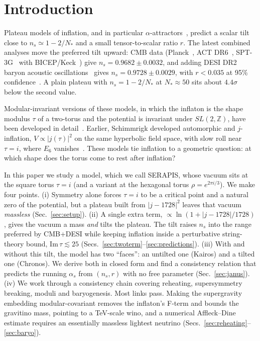 \documentclass[aps,prd,twocolumn,superscriptaddress,nofootinbib,floatfix]{revtex4-2}
\begin{document}
\section{Introduction}
Plateau models of inflation, and in particular $\alpha$-attractors~\cite{arXiv_1306_5220}, predict a scalar tilt close to $n_s \simeq 1-2/N_*$ and a small tensor-to-scalar ratio $r$. The latest combined analyses move the preferred tilt upward: CMB data (Planck~\cite{Planck2018X}, ACT DR6~\cite{arXiv_2503_14452}, SPT-3G~\cite{arXiv_2506_20707} with BICEP/Keck~\cite{arXiv_2110_00483}) give $n_s = 0.9682 \pm 0.0032$, and adding DESI DR2 baryon acoustic oscillations~\cite{arXiv_2503_14738} gives $n_s = 0.9728 \pm 0.0029$, with $r < 0.035$ at 95\% confidence~\cite{arXiv_2512_10613}. A plain plateau with $n_s=1-2/N_*$ at $N_* \approx 50$ sits about $4.4\sigma$ below the second value.

Modular-invariant versions of these models, in which the inflaton is the shape modulus $\tau$ of a two-torus and the potential is invariant under $SL(2,\mathbb{Z})$, have been developed in detail~\cite{arXiv_2408_05203,arXiv_2412_19324,arXiv_2405_06497,arXiv_2407_12081,arXiv_2411_18603}. Earlier, Schimmrigk developed automorphic and $j$-inflation, $V\propto|j(\tau)|^2$ on the same hyperbolic field space, with slow roll near $\tau=i$, where $E_6$ vanishes~\cite{arXiv_1512_09082,arXiv_1612_09559}. These models tie inflation to a geometric question: at which shape does the torus come to rest after inflation?

In this paper we study a model, which we call SERAPIS, whose vacuum sits at the square torus $\tau = i$ (and a variant at the hexagonal torus $\rho = e^{2\pi i/3}$). We make four points.
(i) Symmetry alone forces $\tau = i$ to be a critical point and a natural zero of the potential, but a plateau built from $|j-1728|^2$ leaves that vacuum \emph{massless} (Sec.~\ref{sec:setup}).
(ii) A single extra term, $\propto \ln(1+|j-1728|/1728)$, gives the vacuum a mass \emph{and} tilts the plateau. The tilt raises $n_s$ into the range preferred by CMB+DESI while keeping inflation inside a perturbative string-theory bound, $\mathrm{Im}\,\tau \lesssim 25$ (Secs.~\ref{sec:twoterm}--\ref{sec:predictions}).
(iii) With and without this tilt, the model has two ``faces'': an untilted one (Kairos) and a tilted one (Chronos). We derive both in closed form and find a consistency relation that predicts the running $\alpha_s$ from $(n_s, r)$ with no free parameter (Sec.~\ref{sec:janus}).
(iv) We work through a consistency chain covering reheating, supersymmetry breaking, moduli and baryogenesis. Most links pass. Making the supergravity embedding modular-covariant removes the inflaton's F-term and bounds the gravitino mass, pointing to a TeV-scale wino, and a numerical Affleck--Dine estimate requires an essentially massless lightest neutrino (Secs.~\ref{sec:reheating}--\ref{sec:baryo}).
\end{document}
